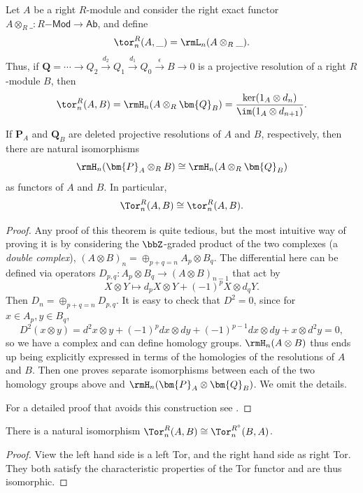 \begin{defn}
    Let $A$ be a right $R$-module and consider the right exact functor $A\otimes_R \_:R\mathsf{-Mod}\to \mathsf{Ab}$, and define
    \[\tor_n^R(A,\_)=\rmL_n(A\otimes_R \_).\]
    Thus, if $\bm{Q}=\cdots\to Q_2\overset{d_2}{\to}Q_1\overset{d_1}{\to}Q_0\overset{\epsilon}{\to}B\to 0$ is a projective resolution of a right $R$-module $B$, then
    \[\tor_n^R(A,B)=\rmH_n(A\otimes_R\bm{Q}_B)=\frac{\ker(1_A\otimes d_n)}{\im(1_A\otimes d_{n+1})}.\]
\end{defn}

\begin{thm}\label{thm Tor=tor}
    If $\bm{P}_A$ and $\bm{Q}_B$ are deleted projective resolutions of $A$ and $B$, respectively, then there are natural isomorphisms
    \[\rmH_n(\bm{P}_A\otimes_R B)\cong \rmH_n(A\otimes_R \bm{Q}_B)\]
    as functors of $A$ and $B$. In particular,
    \[\Tor_n^R(A,B)\cong \tor_n^R(A,B).\]
\end{thm}
\begin{proof}
    Any proof of this theorem is quite tedious, but the most intuitive way of proving it is by considering the $\bbZ$-graded product of the two complexes (a \emph{double complex}), $(A\otimes B)_n=\oplus_{p+q=n}A_p\otimes B_q$. The differential here can be defined via operators $D_{p,q}:A_p\otimes B_q\to (A\otimes B)_{n-1}$ that act by
    \[X\otimes Y\mapsto d_pX\otimes Y+(-1)^pX\otimes d_qY.\]
    Then $D_n=\oplus_{p+q=n}D_{p,q}$. It is easy to check that $D^2=0$, since for $x\in A_p,y\in B_q$,
    \[D^2(x\otimes y)=d^2x\otimes y+(-1)^pdx\otimes dy+(-1)^{p-1}dx\otimes dy+x\otimes d^2y=0,\]
    so we have a complex and can define homology groups. $\rmH_n(A\otimes B)$ thus ends up being explicitly expressed in terms of the homologies of the resolutions of $A$ and $B$. Then one proves separate isomorphisms between each of the two homology groups above and $\rmH_n(\bm{P}_A\otimes \bm{Q}_B)$. We omit the details.

    For a detailed proof that avoids this construction see \cite[Thm.~6.32]{Rotman}.
\end{proof}


\begin{cor}
    There is a natural isomorphism $\Tor_n^R(A,B)\cong \Tor_n^{R^\circ}(B,A)$.
\end{cor}
\begin{proof}
    View the left hand side is a left Tor, and the right hand side as right Tor. They both satisfy the characteristic properties of the Tor functor and are thus isomorphic.
\end{proof}

